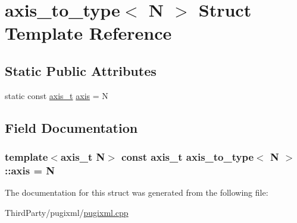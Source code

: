 \hypertarget{structaxis__to__type}{\section{axis\-\_\-to\-\_\-type$<$ N $>$ Struct Template Reference}
\label{structaxis__to__type}
}
\subsection*{Static Public Attributes}
\begin{DoxyCompactItemize}
\item 
static const \hyperlink{pugixml_8cpp_ae7747145441b0591a5c04f20f6f9189a}{axis\-\_\-t} \hyperlink{structaxis__to__type_ac9d75681918ad98c980db0f49b570b50}{axis} = N
\end{DoxyCompactItemize}


\subsection{Field Documentation}
\hypertarget{structaxis__to__type_ac9d75681918ad98c980db0f49b570b50}{
\subsubsection[{axis}]{\setlength{\rightskip}{0pt plus 5cm}template$<$axis\-\_\-t N$>$ const {\bf axis\-\_\-t} {\bf axis\-\_\-to\-\_\-type}$<$ N $>$\-::axis = N\hspace{0.3cm}{\ttfamily [static]}}}\label{structaxis__to__type_ac9d75681918ad98c980db0f49b570b50}


The documentation for this struct was generated from the following file\-:\begin{DoxyCompactItemize}
\item 
Third\-Party/pugixml/\hyperlink{pugixml_8cpp}{pugixml.\-cpp}\end{DoxyCompactItemize}
